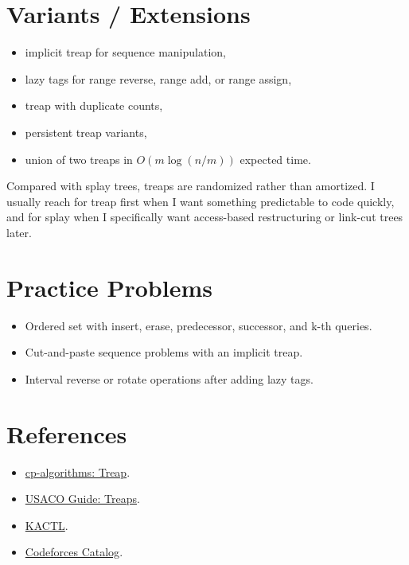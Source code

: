 \section*{Variants / Extensions}

\begin{itemize}
  \item implicit treap for sequence manipulation,
  \item lazy tags for range reverse, range add, or range assign,
  \item treap with duplicate counts,
  \item persistent treap variants,
  \item union of two treaps in \(O(m \log(n/m))\) expected time.
\end{itemize}

Compared with splay trees, treaps are randomized rather than amortized. I usually reach for treap first when I want
something predictable to code quickly, and for splay when I specifically want access-based restructuring or link-cut
trees later.

\section*{Practice Problems}

\begin{itemize}
  \item Ordered set with insert, erase, predecessor, successor, and k-th queries.
  \item Cut-and-paste sequence problems with an implicit treap.
  \item Interval reverse or rotate operations after adding lazy tags.
\end{itemize}

\section*{References}

\begin{itemize}
  \item \href{https://cp-algorithms.com/data_structures/treap.html}{cp-algorithms: Treap}.
  \item \href{https://usaco.guide/adv/treaps}{USACO Guide: Treaps}.
  \item \href{https://github.com/kth-competitive-programming/kactl}{KACTL}.
  \item \href{https://codeforces.com/catalog}{Codeforces Catalog}.
\end{itemize}
